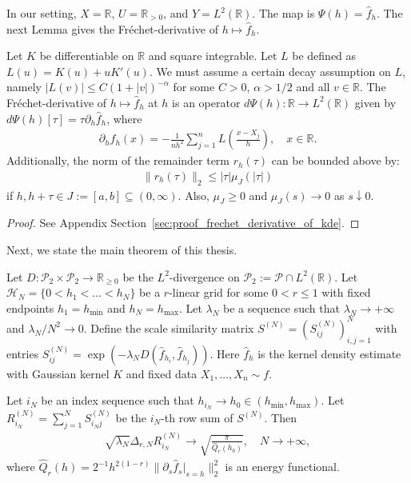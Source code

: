 In our setting, $X=\mathbb{R}$, $U=\mathbb{R}_{>0}$, and $Y=L^2(\mathbb{R})$. The map is $\Psi(h)=\hat{f}_h$. The next Lemma gives the Fréchet-derivative of $h\mapsto\hat{f}_h$.

\begin{Lem}\label{lem:frechet_derivative_of_kde}
    Let $K$ be differentiable on $\mathbb{R}$ and square integrable. Let $L$ be defined as $L(u)=K(u)+uK'(u)$. We must assume a certain decay assumption on $L$, namely $|L(v)|\le C(1+|v|)^{-\alpha}$ for some $C>0$, $\alpha>1/2$ and all $v\in\mathbb{R}$. The Fréchet-derivative of $h\mapsto\hat{f}_h$ at $h$ is an operator $d\Psi(h):\mathbb{R}\to L^2(\mathbb{R})$ given by $d\Psi(h)[\tau]=\tau\partial_h\hat{f}_h$, where
    \begin{align*}
        \partial_h\hat{f}_h(x)=-\frac{1}{nh^2}\sum_{j=1}^{n}L\left(\frac{x-X_j}{h}\right),\quad x\in\mathbb{R}.
    \end{align*}
    Additionally, the norm of the remainder term $r_h(\tau)$ can be bounded above by:
    \begin{align*}
        \|r_h(\tau)\|_2\le|\tau|\mu_J(|\tau|)
    \end{align*}
    if $h,h+\tau\in J:=[a,b]\subseteq(0,\infty)$. Also, $\mu_J\ge0$ and $\mu_J(s)\to0$ as $s\downarrow0$.
\end{Lem}

\begin{proof}
    See Appendix Section~\ref{sec:proof_frechet_derivative_of_kde}.
\end{proof}

Next, we state the main theorem of this thesis.

\begin{Prop}\label{prop:main_thm}
    Let $D:\mathcal{P}_2\times\mathcal{P}_2\to\mathbb{R}_{\ge0}$ be the $L^2$-divergence on $\mathcal{P}_2:=\mathcal{P}\cap L^2(\mathbb{R})$. Let $\mathcal{H}_N=\{0<h_1<\dots<h_N\}$ be a $r$-linear grid for some $0<r\le1$ with fixed endpoints $h_1=h_{\min}$ and $h_N=h_{\max}$. Let $\lambda_N$ be a sequence such that $\lambda_N\to+\infty$ and $\lambda_N/N^2\to0$. Define the scale similarity matrix $S^{(N)}=(S^{(N)}_{ij})_{i,j=1}^{N}$ with entries $S_{ij}^{(N)}=\exp{(-\lambda_ND(\hat{f}_{h_i},\hat{f}_{h_j}))}$. Here $\hat{f}_h$ is the kernel density estimate with Gaussian kernel $K$ and fixed data $X_1,\dots,X_n\sim f$.

    Let $i_N$ be an index sequence such that $h_{i_N}\to h_0\in(h_{\min},h_{\max})$. Let $R_{i_N}^{(N)}=\sum_{j=1}^{N}S_{i_Nj}^{(N)}$ be the $i_N$-th row sum of $S^{(N)}$. Then
    \begin{align*}
        \sqrt{\lambda_N}\Delta_{r,N}R_{i_N}^{(N)}\to\sqrt{\frac{\pi}{\hat{Q}_r(h_0)}},\quad N\to+\infty,
    \end{align*}
    where $\hat{Q}_r(h)=2^{-1}h^{2(1-r)}\|\partial_s\hat{f}_s|_{s=h}\|_2^2$ is an energy functional.
\end{Prop}


